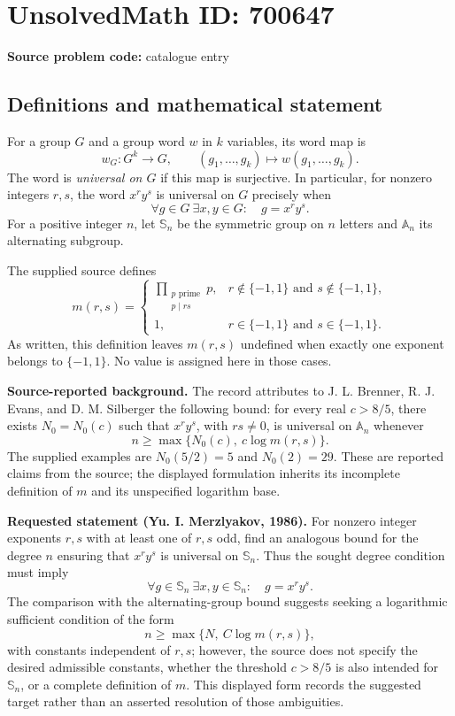 \documentclass[11pt]{article}
\begin{document}
\section*{UnsolvedMath ID: 700647}
\textbf{Source problem code:} catalogue entry
\subsection{Definitions and mathematical statement}
For a group \(G\) and a group word \(w\) in \(k\) variables, its word map is
\[
 w_G:G^k\longrightarrow G,\qquad (g_1,\ldots,g_k)\longmapsto w(g_1,\ldots,g_k).
\]
The word is \emph{universal on \(G\)} if this map is surjective. In particular, for nonzero integers \(r,s\), the word \(x^ry^s\) is universal on \(G\) precisely when
\[
 \forall g\in G\ \exists x,y\in G:\quad g=x^ry^s.
\]
For a positive integer \(n\), let \(\mathbb S_n\) be the symmetric group on \(n\) letters and \(\mathbb A_n\) its alternating subgroup.

The supplied source defines
\[
 m(r,s)=
 \begin{cases}
 \displaystyle\prod_{\substack{p\text{ prime}\\p\mid rs}}p,
   & r\notin\{-1,1\}\text{ and }s\notin\{-1,1\},\\
 1,&r\in\{-1,1\}\text{ and }s\in\{-1,1\}.
 \end{cases}
\]
As written, this definition leaves \(m(r,s)\) undefined when exactly one exponent belongs to \(\{-1,1\}\). No value is assigned here in those cases.

\textbf{Source-reported background.} The record attributes to J. L. Brenner, R. J. Evans, and D. M. Silberger the following bound: for every real \(c>8/5\), there exists \(N_0=N_0(c)\) such that \(x^ry^s\), with \(rs\ne0\), is universal on \(\mathbb A_n\) whenever
\[
 n\ge\max\{N_0(c),\ c\log m(r,s)\}.
\]
The supplied examples are \(N_0(5/2)=5\) and \(N_0(2)=29\). These are reported claims from the source; the displayed formulation inherits its incomplete definition of \(m\) and its unspecified logarithm base.

\textbf{Requested statement (Yu. I. Merzlyakov, 1986).} For nonzero integer exponents \(r,s\) with at least one of \(r,s\) odd, find an analogous bound for the degree \(n\) ensuring that \(x^ry^s\) is universal on \(\mathbb S_n\). Thus the sought degree condition must imply
\[
 \forall g\in\mathbb S_n\ \exists x,y\in\mathbb S_n:\quad g=x^ry^s.
\]
The comparison with the alternating-group bound suggests seeking a logarithmic sufficient condition of the form
\[
 n\ge\max\{N,\ C\log m(r,s)\},
\]
with constants independent of \(r,s\); however, the source does not specify the desired admissible constants, whether the threshold \(c>8/5\) is also intended for \(\mathbb S_n\), or a complete definition of \(m\). This displayed form records the suggested target rather than an asserted resolution of those ambiguities.
\end{document}
